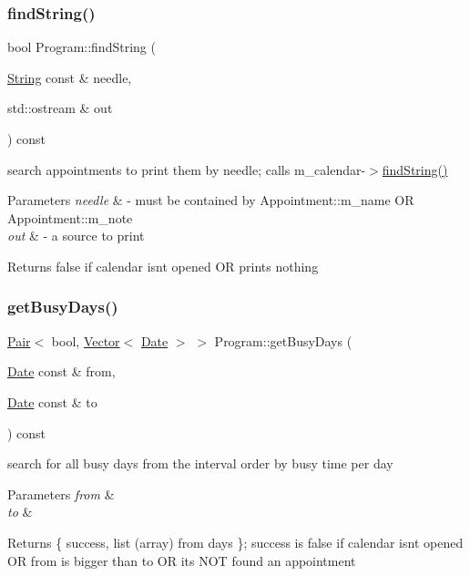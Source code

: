 \subsubsection{\texorpdfstring{find\+String()}{findString()}}
{\footnotesize\ttfamily bool Program\+::find\+String (\begin{DoxyParamCaption}\item[{\hyperlink{classString}{String} const \&}]{needle,  }\item[{std\+::ostream \&}]{out }\end{DoxyParamCaption}) const}

search appointments to print them by needle; calls m\+\_\+calendar-\/$>$\hyperlink{classProgram_af80c02ad4f189ee0d6c67ccc7efdc814}{find\+String()} 
\begin{DoxyParams}{Parameters}
{\em needle} & -\/ must be contained by Appointment\+::m\+\_\+name OR Appointment\+::m\+\_\+note \\
\hline
{\em out} & -\/ a source to print \\
\hline
\end{DoxyParams}
\begin{DoxyReturn}{Returns}
false if calendar isn\textquotesingle{}t opened OR prints nothing 
\end{DoxyReturn}
\mbox{\label{classProgram_af91512a81cffe079b6c300f47df906e8}} 
\subsubsection{\texorpdfstring{get\+Busy\+Days()}{getBusyDays()}}
{\footnotesize\ttfamily \hyperlink{structPair}{Pair}$<$ bool, \hyperlink{classVector}{Vector}$<$ \hyperlink{classDate}{Date} $>$ $>$ Program\+::get\+Busy\+Days (\begin{DoxyParamCaption}\item[{\hyperlink{classDate}{Date} const \&}]{from,  }\item[{\hyperlink{classDate}{Date} const \&}]{to }\end{DoxyParamCaption}) const}

search for all busy days from the interval order by busy time per day 
\begin{DoxyParams}{Parameters}
{\em from} & \\
\hline
{\em to} & \\
\hline
\end{DoxyParams}
\begin{DoxyReturn}{Returns}
\{ success, list (array) from days \}; success is false if calendar isn\textquotesingle{}t opened OR from is bigger than to OR it\textquotesingle{}s N\+OT found an appointment 
\end{DoxyReturn}
\mbox{\label{classProgram_a78c686e8f768666e0377b23317134b4a}} 
